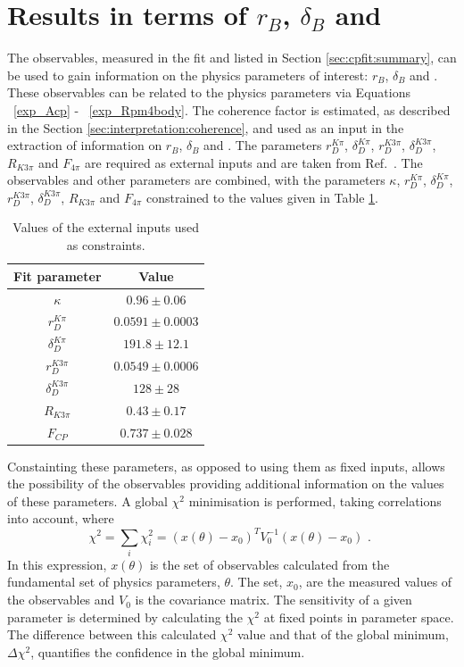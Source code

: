 \section{Results in terms of $r_B$, $\delta_B$ and \Pgamma}
\label{sec:interpretation:gammadini}

The \CP observables, measured in the \CP fit and listed in Section \ref{sec:cpfit:summary}, can be used to gain information on the physics parameters of interest: $r_B$, $\delta_B$ and \Pgamma. These observables can be related to the physics parameters via Equations ~\ref{exp_Acp} - ~\ref{exp_Rpm4body}. The coherence factor is estimated, as described in the Section \ref{sec:interpretation:coherence}, and used as an input in the extraction of information on $r_B$, $\delta_B$ and \Pgamma. The parameters $r_D^{K\pi}$, $\delta_D^{K\pi}$, $r_D^{K3\pi}$, $\delta_D^{K3\pi}$, $R_{K3\pi}$ and $F_{4\pi}$ are required as external inputs and are taken from Ref.~\cite{HFAG,charmk3pi,LHCb-PAPER-2015-057,charm4pi}. The \CP observables and other parameters are combined, with the parameters $\kappa$, $r_D^{K\pi}$, $\delta_D^{K\pi}$, $r_D^{K3\pi}$, $\delta_D^{K3\pi}$, $R_{K3\pi}$ and $F_{4\pi}$ constrained to the values given in Table \ref{inputparameters}. 

\begin{table}
\centering
\begin{tabular}{cc}
Fit parameter & Value \\
\hline
$\kappa$ & $0.96 \pm 0.06$ \\
$r_D^{K\pi}$ & $0.0591 \pm 0.0003$ \\
$\delta_D^{K\pi}$ & $191.8 \pm 12.1$ \\
$r_D^{K3\pi}$ & $0.0549 \pm 0.0006$ \\
$\delta_D^{K3\pi}$ & $128 \pm 28$ \\
$R_{K3\pi}$ & $0.43 \pm 0.17$ \\
$F_{CP}$ & $0.737 \pm 0.028$
\end{tabular}
\caption{Values of the external inputs used as constraints.}
\label{inputparameters}
\end{table}

Constainting these parameters, as opposed to using them as fixed inputs, allows the possibility of the \CP observables providing additional information on the values of these parameters. A global $\chi^2$ minimisation is performed, taking correlations into account, where
\begin{equation}
\chi^2 = \sum_i \chi^2_i = (x(\theta) - x_0)^TV_0^{-1}(x(\theta)-x_0) \text{ . }
\end{equation}
In this expression, $x(\theta)$ is the set of observables calculated from the fundamental set of physics parameters, $\theta$. The set, $x_0$, are the measured values of the observables and $V_0$ is the covariance matrix. The sensitivity of a given parameter is determined by calculating the $\chi^2$ at fixed points in parameter space. The difference between this calculated $\chi^2$ value and that of the global minimum, $\Delta\chi^2$, quantifies the confidence in the global minimum. 

